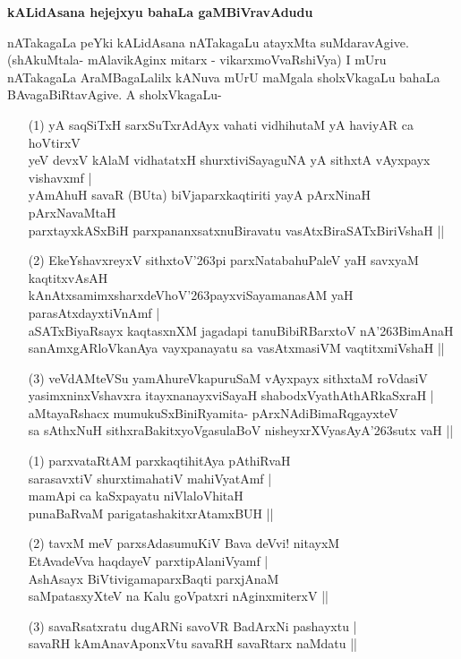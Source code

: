 \noindent
{\bf\large{kALidAsana hejejxyu bahaLa gaMBiVravAdudu}}\label{page243}

nATakagaLa peYki kALidAsana nATakagaLu atayxMta suMdaravAgive. (shAkuMtala- mAlavikAginx mitarx - vikarxmoVvaRshiVya) I mUru nATakagaLa AraMBagaLalilx kANuva mUrU maMgala sholxVkagaLu bahaLa BAvagaBiRtavAgive. A sholxVkagaLu-

\begin{itemize}
\item[(1)] yA saqSiTxH sarxSuTxrAdAyx vahati vidhihutaM yA haviyAR ca hoVtirxV \\\label{243}
yeV devxV kAlaM vidhatatxH shurxtiviSayaguNA yA sithxtA vAyxpayx vishavxmf |\\
yAmAhuH savaR (BUta) biVjaparxkaqtiriti yayA pArxNinaH pArxNavaMtaH \\
parxtayxkASxBiH parxpananxsatxnuBiravatu vasAtxBiraSATxBiriVshaH ||
\item[(2)] EkeYshavxreyxV sithxtoV\char'263pi parxNatabahuPaleV yaH savxyaM kaqtitxvAsAH \\\label{243}
kAnAtxsamimxsharxdeVhoV\char'263payxviSayamanasAM yaH parasAtxdayxtiVnAmf |\\
aSATxBiyaRsayx kaqtasxnXM jagadapi tanuBibiRBarxtoV nA\char'263BimAnaH\\
sanAmxgARloVkanAya vayxpanayatu sa vasAtxmasiVM vaqtitxmiVshaH ||
\item[(3)] veVdAMteVSu yamAhureVkapuruSaM vAyxpayx sithxtaM roVdasiV\\\label{243}
yasimxninxVshavxra itayxnanayxviSayaH shabodxVyathAthARkaSxraH |\\
aMtayaRshacx mumukuSxBiniRyamita- pArxNAdiBimaRqgayxteV \\
sa sAthxNuH sithxraBakitxyoVgasulaBoV nisheyxrXVyasAyA\char'263sutx vaH ||
\end{itemize}

\begin{itemize}
\item[(1)] parxvataRtAM parxkaqtihitAya pAthiRvaH\\\label{243}
sarasavxtiV shurxtimahatiV mahiVyatAmf |\\
mamApi ca kaSxpayatu niVlaloVhitaH \\
punaBaRvaM parigatashakitxrAtamxBUH ||
\item[(2)] tavxM meV parxsAdasumuKiV Bava deVvi! nitayxM\\\label{244}
EtAvadeVva haqdayeV parxtipAlaniVyamf |\\
AshAsayx BiVtivigamaparxBaqti parxjAnaM \\
saMpatasxyXteV na Kalu goVpatxri nAginxmiterxV ||
\item[(3)] savaRsatxratu dugARNi savoVR BadArxNi pashayxtu |\\\label{244}
savaRH kAmAnavAponxVtu savaRH savaRtarx naMdatu ||
\end{itemize}

